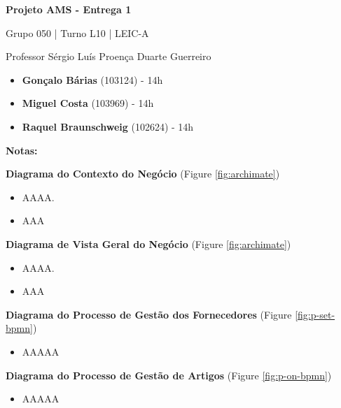 \documentclass[12pt,a4paper]{article}
\begin{document}
\begin{titlepage}
  \begin{center}
    \vspace*{5cm}

    \Huge
    \textbf{Projeto AMS - Entrega 1}

    \vspace{0.5cm}
    \LARGE
    Grupo 050 | Turno L10 | LEIC-A

    \vspace{0.5cm}
    \large
    Professor Sérgio Luís Proença Duarte Guerreiro

    \vfill
    \large
  \end{center}
  \begin{itemize}
    \item[] \textbf{Gonçalo Bárias} (103124) - 14h
    \item[] \textbf{Miguel Costa} (103969) - 14h
    \item[] \textbf{Raquel Braunschweig} (102624) - 14h
  \end{itemize}
\end{titlepage}

\begin{tcolorbox}[enhanced jigsaw,colback=bg,boxrule=0pt,arc=4pt]
  \begin{large}
    \textbf{Notas:}
  \end{large}

  \begin{small}
    \textbf{Diagrama do Contexto do Negócio} (Figure \ref{fig:archimate})
  \end{small}
  \begin{itemize}
    \item AAAA.
    \item AAA
  \end{itemize}

  \begin{small}
    \textbf{Diagrama de Vista Geral do Negócio} (Figure \ref{fig:archimate})
  \end{small}
  \begin{itemize}
    \item AAAA.
    \item AAA
  \end{itemize}

  \begin{small}
    \textbf{Diagrama do Processo de Gestão dos Fornecedores} (Figure \ref{fig:p-set-bpmn})
  \end{small}
  \begin{itemize}
    \item AAAAA
  \end{itemize}

  \begin{small}
    \textbf{Diagrama do Processo de Gestão de Artigos} (Figure \ref{fig:p-on-bpmn})
  \end{small}
  \begin{itemize}
    \item AAAAA
  \end{itemize}
\end{tcolorbox}
  
\end{document}
